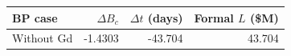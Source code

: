 \begin{center}\small
\begin{tabular}{lrrr}
\toprule
BP case & $\Delta B_c$ & $\Delta t$ (days) & Formal $L$ (\$M) \\
\midrule
Without Gd & -1.4303 & -43.704 & 43.704 \\
\bottomrule
\end{tabular}
\end{center}
